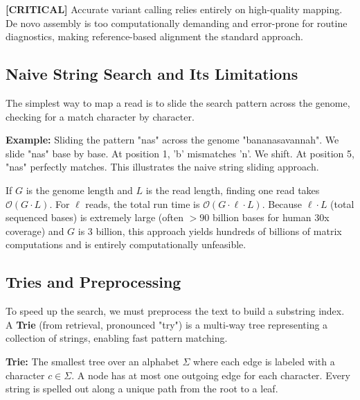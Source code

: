 \documentclass[11pt,a4paper]{article}
\newenvironment{important}{%
    \begin{tcolorbox}[colback=blue!5, colframe=blue!80!black, arc=4mm, boxrule=1pt]
}{%
    \end{tcolorbox}
}
\newcommand{\sta}{\textbf{[CRITICAL] }}
\begin{document}

\sta Accurate variant calling relies entirely on high-quality mapping. De novo assembly is too computationally demanding and error-prone for routine diagnostics, making reference-based alignment the standard approach.

\subsection{Naive String Search and Its Limitations}
The simplest way to map a read is to slide the search pattern across the genome, checking for a match character by character. 

\textbf{Example:} Sliding the pattern "nas" across the genome "bananasavannah".
We slide "nas" base by base. At position 1, 'b' mismatches 'n'. We shift. At position 5, "nas" perfectly matches. This illustrates the naive string sliding approach.

If $G$ is the genome length and $L$ is the read length, finding one read takes $\mathcal{O}(G \cdot L)$. For $\ell$ reads, the total run time is $\mathcal{O}(G \cdot \ell \cdot L)$.
Because $\ell \cdot L$ (total sequenced bases) is extremely large (often $>90$ billion bases for human 30x coverage) and $G$ is 3 billion, this approach yields hundreds of billions of matrix computations and is entirely computationally unfeasible.

\subsection{Tries and Preprocessing}
To speed up the search, we must preprocess the text to build a substring index. A \textbf{Trie} (from retrieval, pronounced "try") is a multi-way tree representing a collection of strings, enabling fast pattern matching.

\begin{important}
    \textbf{Trie:} The smallest tree over an alphabet $\Sigma$ where each edge is labeled with a character $c \in \Sigma$. A node has at most one outgoing edge for each character. Every string is spelled out along a unique path from the root to a leaf.
\end{important}
\end{document}
